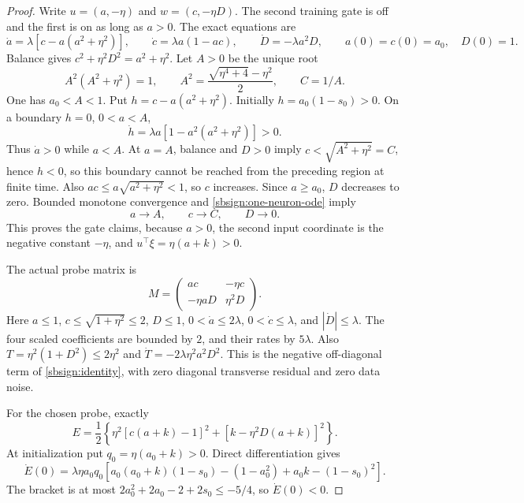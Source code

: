 \documentclass{article} %
\theoremstyle{plain}
\theoremstyle{definition}
\theoremstyle{remark}
\begin{document}
\begin{proof}
Write $u=(a,-\eta)$ and $w=(c,-\eta D)$. The second training gate is
off and the first is on as long as $a>0$. The exact equations are
\begin{equation}\label{sbsign:one-neuron-ode}
 \dot a=\lambda[c-a(a^2+\eta^2)],\qquad
 \dot c=\lambda a(1-ac),\qquad
 \dot D=-\lambda a^2D,
 \qquad a(0)=c(0)=a_0,\quad D(0)=1.
\end{equation}
Balance gives $c^2+\eta^2D^2=a^2+\eta^2$.
Let $A>0$ be the unique root
\[
 A^2(A^2+\eta^2)=1,\qquad
 A^2=\frac{\sqrt{\eta^4+4}-\eta^2}{2},\qquad C=1/A.
\]
One has $a_0<A<1$. Put $h=c-a(a^2+\eta^2)$.
Initially $h=a_0(1-s_0)>0$. On a boundary $h=0$, $0<a<A$,
\[
 \dot h=\lambda a[1-a^2(a^2+\eta^2)]>0.
\]
Thus $\dot a>0$ while $a<A$. At $a=A$, balance and $D>0$ imply
$c<\sqrt{A^2+\eta^2}=C$, hence $h<0$, so this boundary cannot be
reached from the preceding region at finite time. Also
$ac\le a\sqrt{a^2+\eta^2}<1$, so $c$ increases.
Since $a\ge a_0$, $D$ decreases to zero. Bounded monotone convergence
and \eqref{sbsign:one-neuron-ode} imply
\[
 a\longrightarrow A,\qquad c\longrightarrow C,\qquad D\longrightarrow0.
\]
This proves the gate claims, because $a>0$, the second input coordinate
is the negative constant $-\eta$, and
$u^\top\xi=\eta(a+k)>0$.

The actual probe matrix is
\begin{equation}\label{sbsign:exact-matrix}
 M=\begin{pmatrix}ac&-\eta c\\-\eta aD&\eta^2D\end{pmatrix}.
\end{equation}
Here $a\le1$, $c\le\sqrt{1+\eta^2}\le2$, $D\le1$,
$0<\dot a\le2\lambda$, $0<\dot c\le\lambda$,
and $|\dot D|\le\lambda$. The four scaled coefficients are bounded
by $2$, and their rates by $5\lambda$. Also
$T=\eta^2(1+D^2)\le2\eta^2$ and
$\dot T=-2\lambda\eta^2a^2D^2$.
This is the negative off-diagonal term of \eqref{sbsign:identity},
with zero diagonal transverse residual and zero data noise.

For the chosen probe, exactly
\begin{equation}\label{sbsign:exact-error}
 E=\frac12\left\{
 \eta^2[c(a+k)-1]^2+[k-\eta^2D(a+k)]^2\right\}.
\end{equation}
At initialization put $q_0=\eta(a_0+k)>0$. Direct differentiation gives
\[
 \dot E(0)=\lambda\eta a_0q_0
 \left[a_0(a_0+k)(1-s_0)-(1-a_0^2)
                      +a_0k-(1-s_0)^2\right].
\]
The bracket is at most
$2a_0^2+2a_0-2+2s_0\le-5/4$, so $\dot E(0)<0$.


\end{proof}
\end{document}
